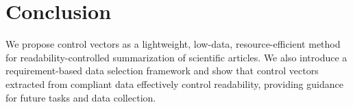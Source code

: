 \section{Conclusion}

We propose control vectors as a lightweight, low-data, resource-efficient method for readability-controlled summarization of scientific articles. We also introduce a requirement-based data selection framework and show that control vectors extracted from compliant data effectively control readability, providing guidance for future tasks and data collection.


